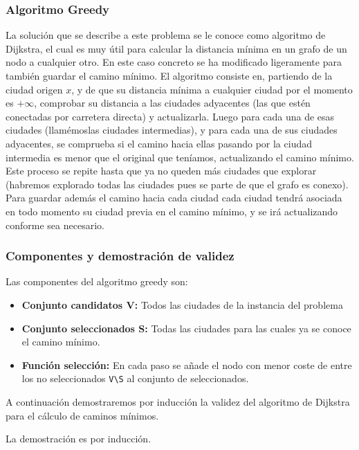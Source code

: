 \documentclass{article}
\begin{document}
\subsubsection{Algoritmo Greedy}
La solución que se describe a este problema se le conoce como algoritmo de Dijkstra, el cual es muy útil para calcular la distancia mínima en un grafo de un nodo a cualquier otro. En este caso concreto se ha modificado ligeramente para también guardar el camino mínimo. El algoritmo consiste en, partiendo de la ciudad origen $x$, y de que su distancia mínima a cualquier ciudad por el momento es $+\infty$, comprobar su distancia a las ciudades adyacentes (las que estén conectadas por carretera directa) y actualizarla. Luego para cada una de esas ciudades (llamémoslas ciudades intermedias), y para cada una de sus ciudades adyacentes, se comprueba si el camino hacia ellas pasando por la ciudad intermedia es menor que el original que teníamos, actualizando el camino mínimo. Este proceso se repite hasta que ya no queden más ciudades que explorar (habremos explorado todas las ciudades pues se parte de que el grafo es conexo). Para guardar además el camino hacia cada ciudad cada ciudad tendrá asociada en todo momento su ciudad previa en el camino mínimo, y se irá actualizando conforme sea necesario.

\subsubsection{Componentes y demostración de validez}

Las componentes del algoritmo greedy son:

\begin{itemize}
    \item \textbf{Conjunto candidatos V:} Todos las ciudades de la instancia del problema
    \item \textbf{Conjunto seleccionados S:} Todas las ciudades para las cuales ya se conoce el camino mínimo.
     \item \textbf{Función selección:} En cada paso se añade el nodo con menor coste de entre los no seleccionados \verb|V\S| al conjunto de seleccionados.
\end{itemize}
A continuación demostraremos por inducción la validez del algoritmo de Dijkstra para el cálculo de caminos mínimos. 

La demostración es por inducción.
\end{document}
